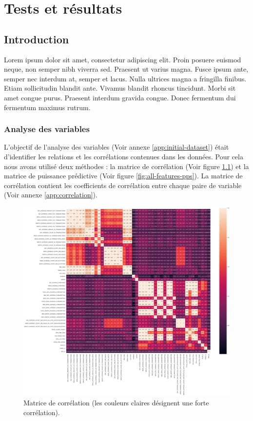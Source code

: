 \chapter{Tests et résultats}
\clearpage
\section{Introduction}
Lorem ipsum dolor sit amet, consectetur adipiscing elit. Proin posuere euismod neque, non semper nibh viverra sed. Praesent ut varius magna. Fusce ipsum ante, semper nec interdum at, semper et lacus. Nulla ultrices magna a fringilla finibus. Etiam sollicitudin blandit ante. Vivamus blandit rhoncus tincidunt. Morbi sit amet congue purus. Praesent interdum gravida congue. Donec fermentum dui fermentum maximus rutrum.


\subsection{Analyse des variables}
L'objectif de l'analyse des variables (Voir annexe \ref{app:initial-dataset}) était d'identifier les relations et les corrélations contenues dans les données. Pour cela nous avons utilisé deux méthodes : la matrice de corrélation (Voir figure \ref{fig:all-features-correlations}) et la matrice de puissance prédictive (Voir figure \ref{fig:all-features-pps}). La matrice de corrélation contient les coefficients de corrélation entre chaque paire de variable (Voir annexe \ref{app:correlation}). 

\begin{figure}[hbt!]
  \centering
  \includegraphics[width=12cm]{images_pfe/features_correlations.png}
  \caption{Matrice de corrélation (les couleurs claires désignent une forte corrélation).}
  \label{fig:all-features-correlations}
\end{figure}
\FloatBarrier

